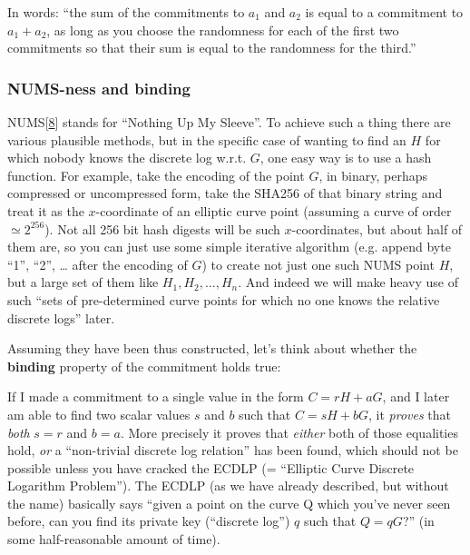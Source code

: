 \documentclass[10pt,a4paper]{article}
\begin{document}
In words: ``the sum of the commitments to $a_1$ and $a_2$ is equal to a commitment
to $a_1 + a_2$, as long as you choose the randomness for each of the first two
commitments so that their sum is equal to the randomness for the third.''

\hypertarget{nums-ness-and-binding}{%
\subsubsection[NUMS-ness and
binding]{\texorpdfstring{\protect\hypertarget{anchor-16}{}{}NUMS-ness
and binding}{NUMS-ness and binding}}\label{nums-ness-and-binding}}

NUMS{[}\protect\hyperlink{anchor-17}{8}{]} stands for ``Nothing Up My
Sleeve''. To achieve such a thing there are various plausible methods,
but in the specific case of wanting to find an $H$ for which nobody knows
the discrete log w.r.t. $G$, one easy way is to use a hash function. For
example, take the encoding of the point $G$, in binary, perhaps compressed
or uncompressed form, take the SHA256 of that binary string and treat it
as the $x$-coordinate of an elliptic curve point (assuming a curve of order
$\simeq 2^{256}$). Not all 256 bit hash digests will be such $x$-coordinates, but about
half of them are, so you can just use some simple iterative algorithm
(e.g. append byte ``1'', ``2'', \ldots{} after the encoding of $G$) to create
not just one such NUMS point $H$, but a large set of them like $H_1, H_2,\ldots, H_n$. And
indeed we will make heavy use of such ``sets of pre-determined curve
points for which no one knows the relative discrete logs'' later.

Assuming they have been thus constructed, let's think about whether the
\textbf{binding} property of the commitment holds true:

If I made a commitment to a single value in the form $C=rH + aG$, and I later am
able to find two scalar values $s$ and $b$ such that $C=sH+bG$, it \emph{proves }that
\emph{both} $s=r$ and $b=a$. More precisely it proves that \emph{either }both of
those equalities hold, \emph{or }a ``non-trivial discrete log relation''
has been found, which should not be possible unless you have cracked the
ECDLP (= ``Elliptic Curve Discrete Logarithm Problem''). The ECDLP (as
we have already described, but without the name) basically says ``given
a point on the curve Q which you've never seen before, can you find its
private key (``discrete log'') $q$ such that $Q=qG$?'' (in some half-reasonable
amount of time).
\end{document}
